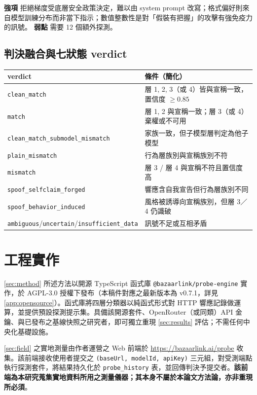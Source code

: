 \documentclass[UTF8,fontset=none,10pt,a4paper,twocolumn]{ctexart}
\begin{document}
\textbf{強項} 拒絕梯度受底層安全政策決定，難以由 system prompt 改寫；格式偏好則來自模型訓練分布而非當下指示；數值整數性是對「假裝有把握」的攻擊有強免疫力的訊號。
\textbf{弱點} 需要 12 個額外探測。

\subsection{判決融合與七狀態 verdict}\label{sec:verdict}

\begin{table}[h]
\centering
\small
\begin{tabularx}{\linewidth}{@{}lX@{}}
\toprule
verdict & 條件（簡化） \\
\midrule
\texttt{clean\_match} & 層 1, 2, 3（或 4）皆與宣稱一致，置信度 ${\geq} 0.85$ \\
\texttt{match} & 層 1, 2 與宣稱一致；層 3（或 4）棄權或不可用 \\
\texttt{clean\_match\_submodel\_mismatch} & 家族一致，但子模型層判定為他子模型 \\
\texttt{plain\_mismatch} & 行為層族別與宣稱族別不符 \\
\texttt{mismatch} & 層 3 / 層 4 與宣稱不符且置信度高 \\
\texttt{spoof\_selfclaim\_forged} & 響應含自我宣告但行為層族別不同 \\
\texttt{spoof\_behavior\_induced} & 風格被誘導向宣稱族別，但層 3／4 仍識破 \\
\texttt{ambiguous}/\texttt{uncertain}/\texttt{insufficient\_data} & 訊號不足或互相矛盾 \\
\bottomrule
\end{tabularx}
\end{table}

\section{工程實作}\label{sec:impl}

\cref{sec:method} 所述方法以開源 TypeScript 函式庫 \texttt{@bazaarlink/probe-engine} 實作，於 AGPL-3.0 授權下發布（本稿件對應之最新版本為 v0.7.1，詳見 \cref{app:opensource}）。函式庫將四層分類器以純函式形式對 HTTP 響應記錄做運算，並提供預設探測提示集。具備該開源套件、OpenRouter（或同類）API 金鑰、與已發布之基線快照之研究者，即可獨立重現 \cref{sec:results} 評估；不需任何中央化基礎設施。

\cref{sec:field} 之實地測量由作者運營之 Web 前端於 \url{https://bazaarlink.ai/probe} 收集。該前端接收使用者提交之 \texttt{(baseUrl, modelId, apiKey)} 三元組，對受測端點執行探測套件，將結果持久化於 \texttt{probe\_history} 表，並回傳判決予提交者。\textbf{該前端為本研究蒐集實地資料所用之測量儀器；其本身不屬於本論文方法論，亦非重現所必須}。
\end{document}
